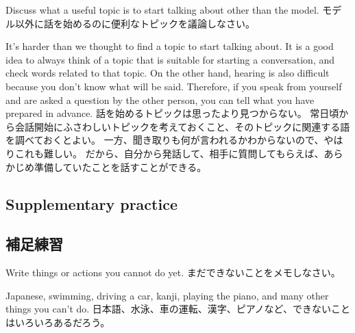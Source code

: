 \documentclass[uplatex,dvipdfmx,b5paper,english,10pt]{jsbook}
\begin{document}
\begin{toiquestion}
\ifEnglish
Discuss what a useful topic is to start talking about other than the model.
\else
モデル以外に話を始めるのに便利なトピックを議論しなさい。
\fi
\end{toiquestion}
\begin{toianswer}
\ifEnglish
It's harder than we thought to find a topic to start talking about.
It is a good idea to always think of a topic that is suitable for starting a conversation, and check words related to that topic.
On the other hand, hearing is also difficult because you don't know what will be said.
Therefore, if you speak from yourself and are asked a question by the other person, you can tell what you have prepared in advance.
\else
話を始めるトピックは思ったより見つからない。
常日頃から会話開始にふさわしいトピックを考えておくこと、そのトピックに関連する語を調べておくとよい。
一方、聞き取りも何が言われるかわからないので、やはりこれも難しい。
だから、自分から発話して、相手に質問してもらえば、あらかじめ準備していたことを話すことができる。
\fi
\end{toianswer}


\ifEnglish
\subsection{Supplementary practice}
\else
\subsection{補足練習}
\fi

\begin{toiquestion}
\ifEnglish
Write things or actions you cannot do yet.
\else
まだできないことをメモしなさい。
\fi
\end{toiquestion}
\begin{toianswer}
\ifEnglish
Japanese, swimming, driving a car, kanji, playing the piano, and many other things you can't do.
\else
日本語、水泳、車の運転、漢字、ピアノなど、できないことはいろいろあるだろう。
\fi
\end{toianswer}
\end{document}
